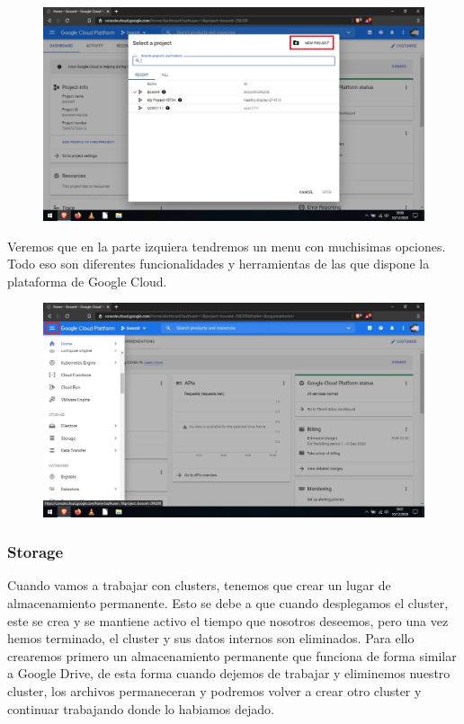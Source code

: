 \documentclass[a4paper,10pt]{article}
\begin{document}
\begin{figure}[H]
\begin{center}
\includegraphics[width=500pt]{./fotos/GoogleCloud/7 - GC (V).jpg}
\end{center}
\end{figure}

Veremos que en la parte izquiera tendremos un menu con muchisimas opciones. Todo eso son diferentes funcionalidades y herramientas de las que dispone la plataforma de Google Cloud. 

\begin{figure}[H]
\begin{center}
\includegraphics[width=500pt]{./fotos/GoogleCloud/8 - GC (V).jpg}
\end{center}
\end{figure}

\subsubsection{Storage}

Cuando vamos a trabajar con clusters, tenemos que crear un lugar de almacenamiento permanente. Esto se debe a que cuando desplegamos el cluster, este se crea y se mantiene activo el tiempo que nosotros deseemos, pero una vez hemos terminado, el cluster y sus datos internos son eliminados. Para ello crearemos primero un almacenamiento permanente que funciona de forma similar a Google Drive, de esta forma cuando dejemos de trabajar y eliminemos nuestro cluster, los archivos permaneceran y podremos volver a crear otro cluster y continuar trabajando donde lo habiamos dejado.
\end{document}
